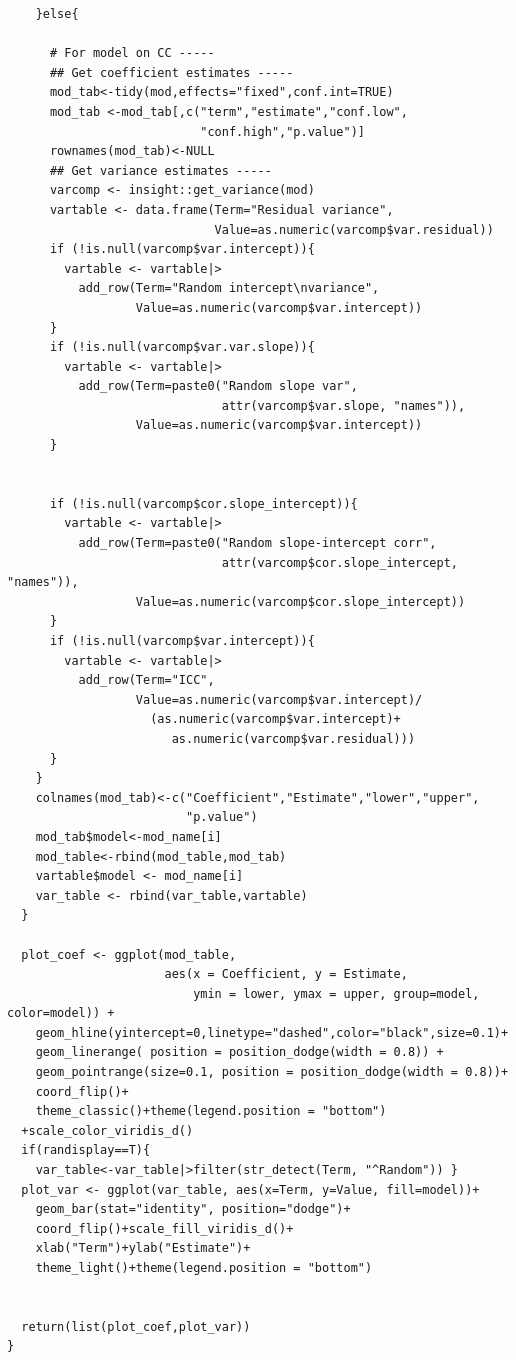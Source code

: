 \documentclass[
  article]{jss}
\begin{document}
\begin{verbatim}
    }else{
      
      # For model on CC -----
      ## Get coefficient estimates -----
      mod_tab<-tidy(mod,effects="fixed",conf.int=TRUE)
      mod_tab <-mod_tab[,c("term","estimate","conf.low",
                           "conf.high","p.value")]
      rownames(mod_tab)<-NULL
      ## Get variance estimates -----
      varcomp <- insight::get_variance(mod)
      vartable <- data.frame(Term="Residual variance",
                             Value=as.numeric(varcomp$var.residual))
      if (!is.null(varcomp$var.intercept)){
        vartable <- vartable|>
          add_row(Term="Random intercept\nvariance",
                  Value=as.numeric(varcomp$var.intercept))
      }
      if (!is.null(varcomp$var.var.slope)){
        vartable <- vartable|>
          add_row(Term=paste0("Random slope var",
                              attr(varcomp$var.slope, "names")),
                  Value=as.numeric(varcomp$var.intercept))
      }
      
      
      if (!is.null(varcomp$cor.slope_intercept)){
        vartable <- vartable|>
          add_row(Term=paste0("Random slope-intercept corr",
                              attr(varcomp$cor.slope_intercept, "names")),
                  Value=as.numeric(varcomp$cor.slope_intercept))
      }
      if (!is.null(varcomp$var.intercept)){
        vartable <- vartable|>
          add_row(Term="ICC",
                  Value=as.numeric(varcomp$var.intercept)/
                    (as.numeric(varcomp$var.intercept)+
                       as.numeric(varcomp$var.residual)))
      }
    }
    colnames(mod_tab)<-c("Coefficient","Estimate","lower","upper",
                         "p.value")
    mod_tab$model<-mod_name[i]
    mod_table<-rbind(mod_table,mod_tab)  
    vartable$model <- mod_name[i]
    var_table <- rbind(var_table,vartable)
  }
  
  plot_coef <- ggplot(mod_table, 
                      aes(x = Coefficient, y = Estimate,
                          ymin = lower, ymax = upper, group=model, color=model)) + 
    geom_hline(yintercept=0,linetype="dashed",color="black",size=0.1)+
    geom_linerange( position = position_dodge(width = 0.8)) + 
    geom_pointrange(size=0.1, position = position_dodge(width = 0.8))+
    coord_flip()+
    theme_classic()+theme(legend.position = "bottom")
  +scale_color_viridis_d()
  if(randisplay==T){
    var_table<-var_table|>filter(str_detect(Term, "^Random")) }
  plot_var <- ggplot(var_table, aes(x=Term, y=Value, fill=model))+
    geom_bar(stat="identity", position="dodge")+
    coord_flip()+scale_fill_viridis_d()+
    xlab("Term")+ylab("Estimate")+ 
    theme_light()+theme(legend.position = "bottom")
  
  
  return(list(plot_coef,plot_var))
}
\end{verbatim}
\end{document}
